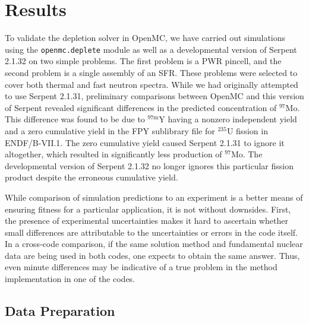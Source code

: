 \documentclass[3p,authoryear]{elsarticle}
\begin{document}
\section{Results}
\label{sec:results}

To validate the depletion solver in OpenMC, we have carried out simulations
using the \texttt{openmc.deplete} module as well as a developmental version of
Serpent 2.1.32 on two simple problems. The first problem is a PWR pincell, and
the second problem is a single assembly of an SFR. These problems were selected
to cover both thermal and fast neutron spectra. While we had originally
attempted to use Serpent 2.1.31, preliminary comparisons between OpenMC and this
version of Serpent revealed significant differences in the predicted
concentration of $^{97}$Mo. This difference was found to be due to
$^{97\text{m}}$Y having a nonzero independent yield and a zero cumulative yield
in the FPY sublibrary file for $^{235}$U fission in ENDF/B-VII.1. The zero
cumulative yield caused Serpent 2.1.31 to ignore it altogether, which resulted
in significantly less production of $^{97}$Mo. The developmental version of
Serpent 2.1.32 no longer ignores this particular fission product despite the
erroneous cumulative yield.

While comparison of simulation predictions to an experiment is a better means of
ensuring fitness for a particular application, it is not without downsides.
First, the presence of experimental uncertainties makes it hard to ascertain
whether small differences are attributable to the uncertainties or errors in the
code itself. In a cross-code comparison, if the same solution method and
fundamental nuclear data are being used in both codes, one expects to obtain the
same answer. Thus, even minute differences may be indicative of a true problem
in the method implementation in one of the codes.

\subsection{Data Preparation}
\end{document}
